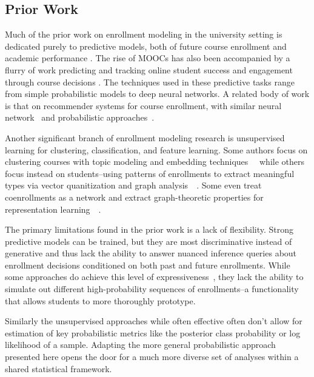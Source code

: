 \documentclass{edm_template}
\begin{document}
\subsection{Prior Work}

Much of the prior work on enrollment modeling in the university setting is dedicated purely to predictive models, both of future course enrollment \cite{kardan2013prediction}\cite{nandeshwar2009enrollment}\cite{song1993new} and academic performance \cite{kovacic2010early} \cite{hlosta2017ouroboros}. The rise of MOOCs has also been accompanied by a flurry of work predicting and tracking online student success and engagement through course decisions \cite{balakrishnan2013predicting}\cite{Gardner2018StudentSP}\cite{AlShabandar2018TheAO}. The techniques used in these predictive tasks range from simple probabilistic models to deep neural networks. A related body of work is that on recommender systems for course enrollment, with similar neural network~\cite{Jiang2018GoalbasedCR} and probabilistic approaches~\cite{Khorasani2016AMC}. 

Another significant branch of enrollment modeling research is unsupervised learning for clustering, classification, and feature learning. Some authors focus on clustering courses with topic modeling and embedding techniques~\cite{Motz2018FindingTI}~\cite{Pardos2018AMO} while others focus instead on students--using patterns of enrollments to extract meaningful types via vector quanitization and graph analysis~\cite{Zeidenberg2011TheCO}~\cite{Slim2016TheIO}. Some even treat coenrollments as a network and extract graph-theoretic properties for representation learning~\cite{gardner2018coenrollment}~\cite{Wang2017AnalyzingCC}. 

The primary limitations found in the prior work is a lack of flexibility. Strong predictive models can be trained, but they are most discriminative instead of generative and thus lack the ability to answer nuanced inference queries about enrollment decisions conditioned on both past and future enrollments. While some approaches do achieve this level of expressiveness~\cite{Jiang2018GoalbasedCR}, they lack the ability to simulate out different high-probability sequences of enrollments--a functionality that allows students to more thoroughly prototype. 

Similarly the unsupervised approaches while often effective often don't allow for estimation of key probabilistic metrics like the posterior class probability or log likelihood of a sample. Adapting the more general probabilistic approach presented here opens the door for a much more diverse set of analyses within a shared statistical framework.
\end{document}
